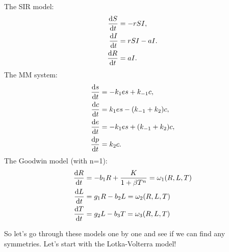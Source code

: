 The SIR model:
\begin{equation}
  \begin{split}
    \dv{S}{t}&=-rSI,\\
    \dv{I}{t}&=rSI-aI.\\
    \dv{R}{t}&=aI.\\    
    \end{split}
  \label{eq:SIR}
\end{equation}
The MM system:
\begin{equation}
  \begin{split}
    \dv{s}{t}&=-k_1 es+k_{-1}c,\\
    \dv{c}{t}&=k_1 es-(k_{-1}+k_2)c,\\
    \dv{e}{t}&=-k_1 es+(k_{-1}+k_2)c,\\
    \dv{p}{t}&=k_2 c.\\        
    \end{split}
  \label{eq:MM}
\end{equation}
The Goodwin model (with n=1):
\begin{equation}
\begin{split}
  \dv{R}{t}&=-b_1 R+\dfrac{K}{1+\beta T^n}=\omega_1 (R,L,T)\\
  \dv{L}{t}&=g_1 R- b_2 L=\omega_2 (R,L,T)\\
    \dv{T}{t}&=g_2 L-b_3 T=\omega_3 (R,L,T)
\end{split}
  \label{eq:Goodwin}
\end{equation}

So let's go through these models one by one and see if we can find any symmetries. Let's start with the Lotka-Volterra model!